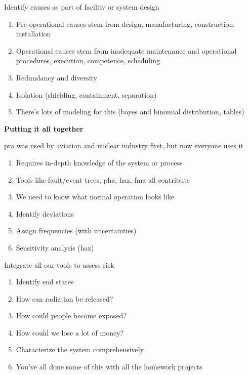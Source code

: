 \documentclass[aspectratio=1610,pdftex,dvipsnames,compress,xcolor={dvipsnames}]{beamer}
\newcommand{\acs}{\acrshort} %
\begin{document}
\begin{frame}{Identify causes as part of facility or system design}
    \begin{enumerate}[series=outerlist,topsep=0pt,itemsep=21pt,leftmargin=*,label=(\arabic*)]
        \item[]Pre-operational causes stem from design, manufacturing, construction, installation
        \item[]Operational causes stem from inadequate maintenance and operational procedures, execution, competence, scheduling
        \item[]Redundancy and diversity  
        \item[]Isolation (shielding, containment, separation)
        \item[]There's lots of modeling for this (bayes and binomial distribution, tables)
    \end{enumerate}
\end{frame}


\begin{frame}[plain]{}
    \centering\LARGE\textbf{Putting it all together}
\end{frame}


\addtocounter{framenumber}{-1}
\begin{frame}{\acs{pra} was used by aviation and nuclear industry first, but now everyone uses it}
    \begin{enumerate}[series=outerlist,topsep=0pt,itemsep=15pt,leftmargin=*,label=(\arabic*)]
        \item[]Requires in-depth knowledge of the system or process  
        \item[]Tools like fault/event trees, \acs{pha}, \acs{haz}, \acs{fma} all contribute
        \item[]We need to know what normal operation looks like
        \item[]Identify deviations
        \item[]Assign frequencies (with uncertainties)
        \item[]Sensitivity analysis (\acs{haz})
    \end{enumerate}
\end{frame}


\begin{frame}{Integrate all our tools to assess risk}
    \begin{enumerate}[series=outerlist,topsep=0pt,itemsep=21pt,leftmargin=*,label=(\arabic*)]
        \item[]Identify end states  
        \item[]How can radiation be released?  
        \item[]How could people become exposed?  
        \item[]How could we lose a lot of money?
        \item[]Characterize the system comprehensively   
        \item[]You've all done some of this with all the homework projects
    \end{enumerate}
\end{frame}
\end{document}
